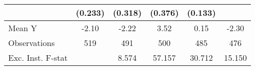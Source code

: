 {\begin{tabular}{l*{5}{c}}
            &     (0.233)         &     (0.318)         &     (0.376)         &     (0.133)         &                     \\
\midrule
Mean Y      &       -2.10         &       -2.22         &        3.52         &        0.15         &       -2.30         \\
Observations&         519         &         491         &         500         &         485         &         476         \\
Exc. Inst. F-stat&                     &       8.574         &      57.157         &      30.712         &      15.150         \\
\bottomrule
\end{tabular}
}
